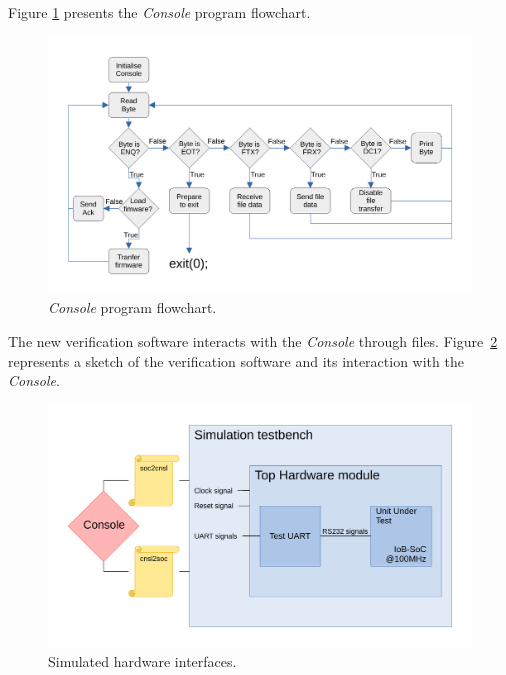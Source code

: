 Figure \ref{fig:console_flow} presents the \textit{Console} program flowchart.

\begin{figure}[!ht]
    \centering
    \includegraphics[width=\linewidth]{../images/console_flow.pdf}
    \caption{\textit{Console} program flowchart.}
    \label{fig:console_flow}
\end{figure}

The new verification software interacts with the \textit{Console} through files. Figure~\ref{fig:uut_top_hw} represents a sketch of the verification software and its interaction with the \textit{Console}.

\begin{figure}[!ht]
    \centering
    \includegraphics[width=\linewidth]{../images/uut_top_hw.pdf}
    \caption{Simulated hardware interfaces.}
    \label{fig:uut_top_hw}
\end{figure}